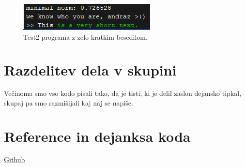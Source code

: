 \documentclass[12pt]{article}
\begin{document}
\begin{figure}[h]
             \centering
             \includegraphics{wrong_guy}
             \caption{Test2 programa z zelo kratkim besedilom.}
\end{figure}

\section{Razdelitev dela v skupini}
Večinoma smo vso kodo pisali tako, da je tisti, ki je delil zaslon dejansko tipkal,
skupaj pa smo razmišljali kaj naj se napiše. 
\section{Reference in dejanksa koda}
\href{https://github.com/leonleon123/prepoznavanje_uporabnika_tipkovnice}{Github}
\end{document}

